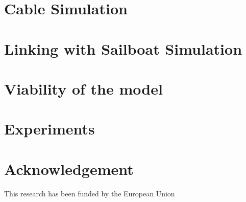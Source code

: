 \documentclass[11pt]{article} %
\begin{document}
\section{Cable Simulation}


\section{Linking with Sailboat Simulation}


\section{Viability of the model}


\section{Experiments}


\section*{Acknowledgement}

This research has been funded by the European Union
%


\nocite{*}


\end{document}
